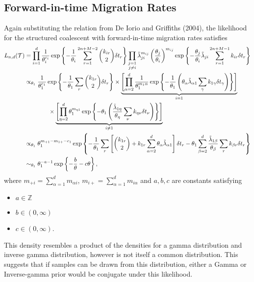 \subsection{Forward-in-time Migration Rates}
	Again substituting the relation from De Iorio and Griffiths (2004), the likelihood for the structured coalescent with forward-in-time migration rates satisfies
			\begin{align*}
			L_{n,d}(\mathcal{T}) & = \prod_{i=1}^d \frac{1}{\theta_i^{c_i}} \exp \left\{ -\frac{1}{\theta_i} \sum_{r = 1}^{2n + M - 2} \binom{k_{ir}}{2} \delta t_r \right\} \prod_{\substack{j=1 \\ j \neq i}} \tilde{\lambda}_{ji}^{m_{ij}} \left(\frac{\theta_j}{\theta_i} \right)^{m_{ij}} \exp \left\{ - \frac{\theta_j}{\theta_i} \tilde{\lambda}_{ji} \sum_{r=1}^{2n+M-1} k_{i r} \delta t_r \right\} \\
				& \propto_{\theta_1} \frac{1}{\theta_1^{c_1}} \exp \left\{- \frac{1}{\theta_1} \sum_r \binom{k_{1r}}{2} \delta t_r \right\} \times \underbrace{\left[\prod_{\alpha = 2}^d \frac{1}{\theta_1^{m_1\alpha}} \exp \left\{ - \frac{1}{\theta_1} \left( \theta_\alpha \tilde{\lambda}_{\alpha 1} \sum_\gamma k_{1\gamma} \delta t_\gamma \right) \right\} \right]}_{i=1} \\
				& \qquad \qquad \times \underbrace{\left[ \prod_{\eta = 2}^d \theta_1^{m_{\eta 1}} \exp \left\{ - \theta_1 \left( \frac{\tilde{\lambda}_{1 \eta}}{\theta_\eta} \sum_\nu k_{\eta \nu} \delta t_\nu \right) \right\} \right]}_{i \neq 1} \\
				& \propto_{\theta_1} \theta_1^{m_{+ 1} - m_{1 +} - c_1} \exp \left\{ -\frac{1}{\theta_1} \sum_r \left[ \binom{k_{1r}}{2} + k_{1r} \sum_{\alpha=2}^d \theta_\alpha \tilde{\lambda}_{\alpha 1}  \right] \delta t_r - \theta_1 \sum_{\beta = 2}^d \frac{\tilde{\lambda}_{1 \beta}}{\theta_\beta} \sum_r k_{\beta r} \delta t_r   \right\} \\
				& \sim_{\theta_1} \theta_1^{-a - 1} \exp \left\{ - \frac{b}{\theta} - c \theta \right\},
		\end{align*}
	where $m_{+i} = \sum_{\alpha = 1}^d m_{\alpha i}$, $m_{i+} = \sum_{\alpha = 1}^d m_{i \alpha}$ and $a,b,c$ are constants satisfying
		\begin{itemize}
			\item $a \in \mathbb{Z}$
			\item $b \in (0,\infty)$
			\item $c \in (0, \infty)$.
		\end{itemize}
	This density resembles a product of the densities for a gamma distribution and inverse gamma distribution, however is not itself a common distribution. This suggests that if samples can be drawn from this distribution, either a Gamma or Inverse-gamma prior would be conjugate under this likelihood.
	
